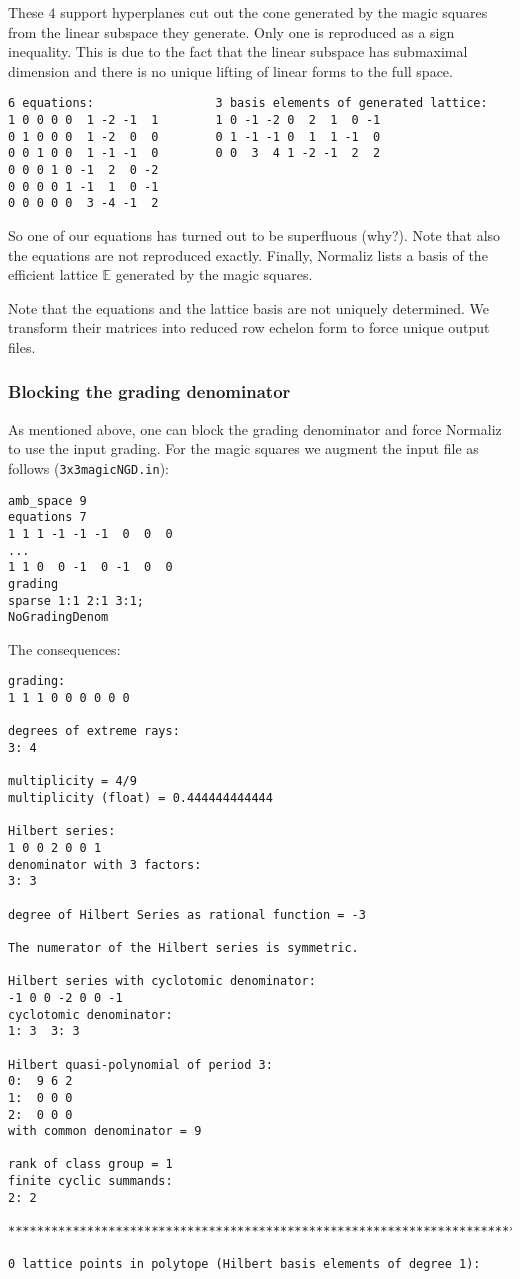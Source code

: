 \documentclass[12pt,a4paper]{scrartcl}
\theoremstyle{definition}
\def\EE{{\mathbb E}}
\begin{document}
These $4$ support hyperplanes cut out the cone generated by the magic squares from the linear subspace they generate. Only one is reproduced as a sign inequality. This is due to the fact that the linear subspace has submaximal dimension and there is no unique lifting of linear forms to the full space.
\begin{Verbatim}
6 equations:                 3 basis elements of generated lattice:
1 0 0 0 0  1 -2 -1  1        1 0 -1 -2 0  2  1  0 -1
0 1 0 0 0  1 -2  0  0        0 1 -1 -1 0  1  1 -1  0
0 0 1 0 0  1 -1 -1  0        0 0  3  4 1 -2 -1  2  2
0 0 0 1 0 -1  2  0 -2
0 0 0 0 1 -1  1  0 -1
0 0 0 0 0  3 -4 -1  2
\end{Verbatim}
So one of our equations has turned out to be superfluous (why?). Note that also the equations are not reproduced exactly. Finally, Normaliz lists a basis of the efficient lattice $\EE$ generated by the magic squares.

Note that the equations and the lattice basis are not uniquely determined. We transform their matrices into reduced row echelon form to force unique output files.

\subsubsection{Blocking the grading denominator}\label{NoGradingDenominator}

As mentioned above, one can block the grading denominator and force Normaliz to use the input grading. For the magic squares we augment the input file as follows (\verb|3x3magicNGD.in|):
\begin{Verbatim}
amb_space 9
equations 7
1 1 1 -1 -1 -1  0  0  0
...
1 1 0  0 -1  0 -1  0  0
grading
sparse 1:1 2:1 3:1;
NoGradingDenom
\end{Verbatim}
The consequences:
\begin{Verbatim}
grading:
1 1 1 0 0 0 0 0 0 

degrees of extreme rays:
3: 4  

multiplicity = 4/9
multiplicity (float) = 0.444444444444

Hilbert series:
1 0 0 2 0 0 1 
denominator with 3 factors:
3: 3  

degree of Hilbert Series as rational function = -3

The numerator of the Hilbert series is symmetric.

Hilbert series with cyclotomic denominator:
-1 0 0 -2 0 0 -1 
cyclotomic denominator:
1: 3  3: 3  

Hilbert quasi-polynomial of period 3:
0:  9 6 2
1:  0 0 0
2:  0 0 0
with common denominator = 9

rank of class group = 1
finite cyclic summands:
2: 2  

***********************************************************************

0 lattice points in polytope (Hilbert basis elements of degree 1):
\end{Verbatim}
\end{document}
